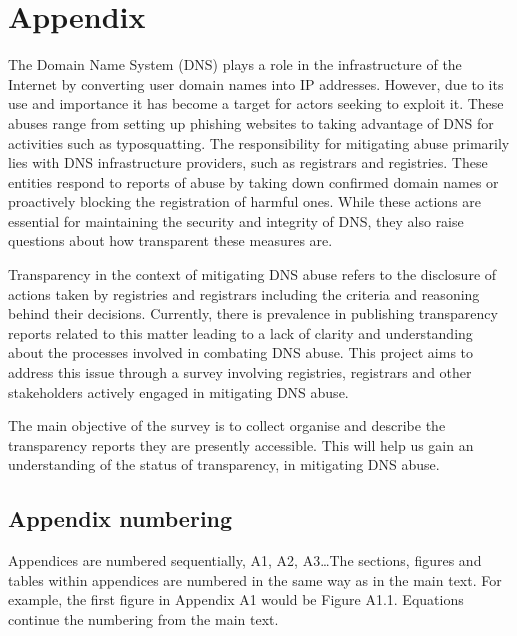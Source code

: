 \chapter{Appendix}


The Domain Name System (DNS) plays a role in the infrastructure of the Internet by converting user domain names into IP addresses. However, due to its use and importance it has become a target for actors seeking to exploit it. These abuses range from setting up phishing websites to taking advantage of DNS for activities such as typosquatting. The responsibility for mitigating abuse primarily lies with DNS infrastructure providers, such as registrars and registries. These entities respond to reports of abuse by taking down confirmed domain names or proactively blocking the registration of harmful ones. While these actions are essential for maintaining the security and integrity of DNS, they also raise questions about how transparent these measures are. 

Transparency in the context of mitigating DNS abuse refers to the disclosure of actions taken by registries and registrars including the criteria and reasoning behind their decisions. Currently, there is prevalence in publishing transparency reports related to this matter leading to a lack of clarity and understanding about the processes involved in combating DNS abuse. This project aims to address this issue through a survey involving registries, registrars and other stakeholders actively engaged in mitigating DNS abuse.

The main objective of the survey is to collect organise and describe the transparency reports they are presently accessible. This will help us gain an understanding of the status of transparency, in mitigating DNS abuse.

\section{Appendix numbering}
Appendices are numbered sequentially, A1, A2, A3\ldots The sections, figures and tables within appendices are numbered in the same way as in the main text. For example, the first figure in Appendix A1 would be Figure A1.1. Equations continue the numbering from the main text.
